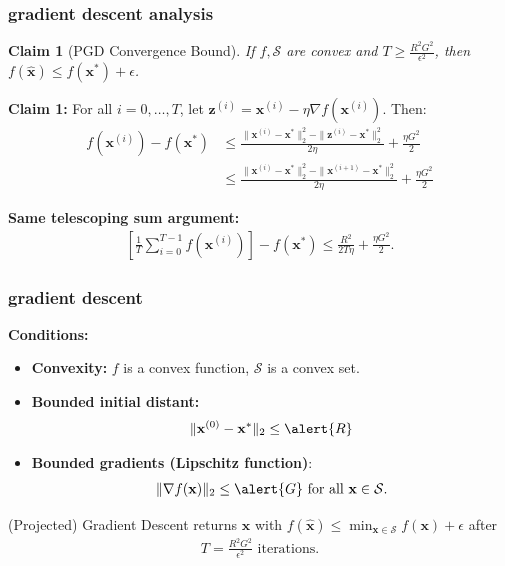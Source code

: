 \documentclass[compress]{beamer}
\newcommand{\bv}[1]{\mathbf{#1}}
\newtheorem{claim}[theorem]{Claim}
\begin{document}
\begin{frame}[t]
	\frametitle{gradient descent analysis}
	\small
\begin{claim}[PGD Convergence Bound]
	If $f, \mathcal{S}$ are convex and $T \geq \frac{R^2G^2}{\epsilon^2}$, then $f(\hat{\bv{x}}) \leq f(\bv{x}^*) + \epsilon$.
\end{claim}
	\textbf{Claim 1:} For all $i = 0, \ldots, T$, let $\bv{z}^{(i)} = \bv{x}^{(i)} - \eta \nabla f(\bv{x}^{(i)})$. Then:
	\begin{align*}
		f(\bv{x}^{(i)}) - f(\bv{x}^*) &\leq \frac{\|\bv{x}^{(i)} - \bv{x}^*\|_2^2 - \|\bv{z}^{(i)} - \bv{x}^*\|_2^2}{2\eta} + \frac{\eta G^2}{2}
		\\&\leq \frac{\|\bv{x}^{(i)} - \bv{x}^*\|_2^2 - \|\bv{x}^{(i+1)} - \bv{x}^*\|_2^2}{2\eta} + \frac{\eta G^2}{2}
	\end{align*}
\vspace{4em}

\textbf{Same telescoping sum argument:}\vspace{-.5em}
\begin{align*}
	\left[\frac{1}{T}\sum_{i=0}^{T-1}f(\bv{x}^{(i)})\right] - f(\bv{x}^*) \leq \frac{R^2}{2T\eta} + \frac{\eta G^2}{2}.
\end{align*}
\end{frame}

\begin{frame}[t]
	\frametitle{gradient descent}
	\textbf{Conditions:}
	\begin{itemize}
		\item \textbf{Convexity:} $f$ is a convex function, $\mathcal{S}$ is a convex set. 
		\item \textbf{Bounded initial distant:} 
		\begin{align*}
			\|\bv{x}^{(0)} - \bv{x}^*\|_2 \leq \alert{R}
		\end{align*}
		\item \textbf{Bounded gradients (Lipschitz function)}: 
		\begin{align*}
			\|\nabla f(\bv{x})\|_2 \leq \alert{G} \text{ for all } \bv{x}\in \mathcal{S}.
		\end{align*}
	\end{itemize}
	
	\begin{theorem}
		(Projected) Gradient Descent returns $\hat{\bv{x}}$ with $f(\hat{\bv{x}}) \leq \min_{\bv{x}\in \mathcal{S}}f(\bv{x})+\epsilon$ after
		\begin{align*}
			T = \frac{R^2 G^2}{\epsilon^2} \text{ iterations.}
		\end{align*}
	\end{theorem}
\end{frame}
\end{document}
